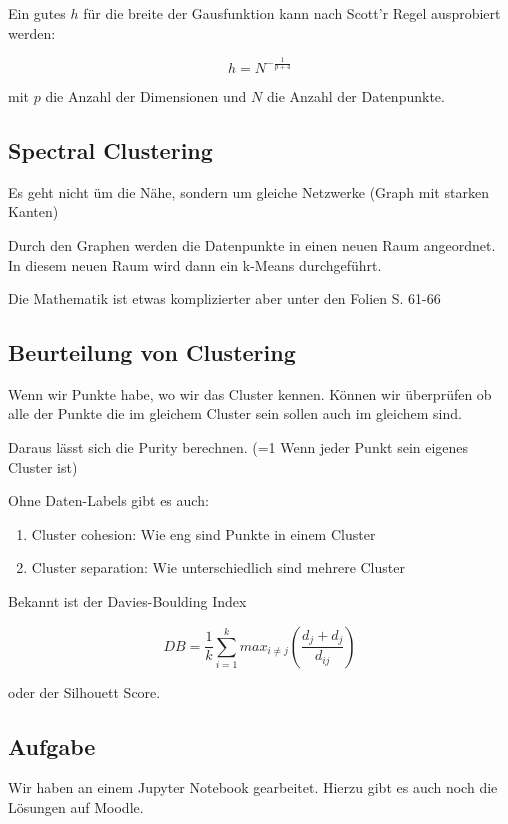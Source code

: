 \documentclass[a4paper]{article}
\begin{document}
Ein gutes $h$ für die breite der Gausfunktion kann nach Scott'r Regel ausprobiert werden:

\[
h = N^{-\frac{1}{p+4}}
\]

mit $p$ die Anzahl der Dimensionen  und $N$ die Anzahl der Datenpunkte.

\subsection{Spectral Clustering}

Es geht nicht üm die Nähe, sondern um gleiche Netzwerke (Graph mit starken Kanten) 

Durch den Graphen werden die Datenpunkte in einen neuen Raum angeordnet. In diesem neuen Raum wird dann ein k-Means durchgeführt.

Die Mathematik ist etwas komplizierter aber unter den Folien S. 61-66 

\subsection{Beurteilung von Clustering}

Wenn wir Punkte habe, wo wir das Cluster kennen. Können wir überprüfen ob alle der Punkte die im gleichem Cluster sein sollen auch im gleichem sind.

Daraus lässt sich die Purity berechnen. (=1 Wenn jeder Punkt sein eigenes Cluster ist)

Ohne Daten-Labels gibt es auch:

\begin{enumerate}
    \item Cluster cohesion: Wie eng sind Punkte in einem Cluster
    \item Cluster separation: Wie unterschiedlich sind mehrere Cluster
\end{enumerate}

Bekannt ist der Davies-Boulding Index

\[
DB = \frac{1}{k} \sum_{i=1}^{k} max_{i\neq j} \left(\frac{d_j + d_j}{d_{ij}}\right)
\]

oder der Silhouett Score.

\subsection{Aufgabe}

Wir haben an einem Jupyter Notebook gearbeitet. Hierzu gibt es auch noch die Lösungen auf Moodle.
\end{document}
